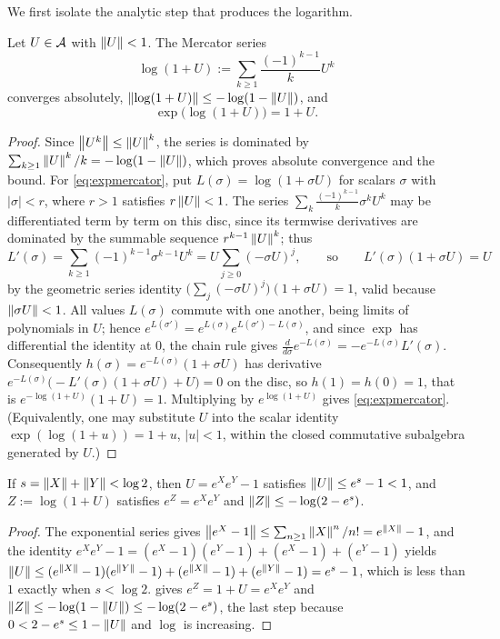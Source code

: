 We first isolate the analytic step that produces the logarithm.
\begin{proposition}\label{prop:mercator}
Let $U\in\mathcal{A}$ with $\left\lVert U\right\rVert<1$. The Mercator series
\begin{equation}\label{eq:mercator}
 \log(1+U):=\sum_{k\geq1}\frac{(-1)^{k-1}}{k}U^k
\end{equation}
converges absolutely, $\left\lVert\log(1+U)\right\rVert\leq-\log(1-\left\lVert U\right\rVert)$, and
\begin{equation}\label{eq:expmercator}
 \exp\bigl(\log(1+U)\bigr)=1+U.
\end{equation}
\end{proposition}
\begin{proof}
Since $\left\lVert U^k\right\rVert\leq\left\lVert U\right\rVert^k$, the series is dominated by
$\sum_{k\geq1}\left\lVert U\right\rVert^k/k=-\log(1-\left\lVert U\right\rVert)$, which proves absolute
convergence and the bound. For \eqref{eq:expmercator}, put
$L(\sigma)=\log(1+\sigma U)$ for scalars $\sigma$ with
$|\sigma|<r$, where $r>1$ satisfies $r\left\lVert U\right\rVert<1$. The series
$\sum_k\frac{(-1)^{k-1}}{k}\sigma^kU^k$ may be differentiated term by term
on this disc, since its termwise derivatives are dominated by the summable
sequence $r^{k-1}\left\lVert U\right\rVert^k$; thus
\[
 L'(\sigma)=\sum_{k\geq1}(-1)^{k-1}\sigma^{k-1}U^k
 =U\sum_{j\geq0}(-\sigma U)^j,
 \qquad\text{so}\qquad L'(\sigma)(1+\sigma U)=U
\]
by the geometric series identity $\bigl(\sum_j(-\sigma U)^j\bigr)(1+\sigma U)=1$,
valid because $\left\lVert\sigma U\right\rVert<1$. All values $L(\sigma)$ commute with one
another, being limits of polynomials in $U$; hence
$e^{L(\sigma')}=e^{L(\sigma)}e^{L(\sigma')-L(\sigma)}$, and since
$\exp$ has differential the identity at $0$, the chain rule gives
$\frac{d}{d\sigma}e^{-L(\sigma)}=-e^{-L(\sigma)}L'(\sigma)$. Consequently
$h(\sigma)=e^{-L(\sigma)}(1+\sigma U)$ has derivative
$e^{-L(\sigma)}\bigl(-L'(\sigma)(1+\sigma U)+U\bigr)=0$ on the disc, so
$h(1)=h(0)=1$, that is $e^{-\log(1+U)}(1+U)=1$. Multiplying by
$e^{\log(1+U)}$ gives \eqref{eq:expmercator}. (Equivalently, one may
substitute $U$ into the scalar identity $\exp(\log(1+u))=1+u$, $|u|<1$,
within the closed commutative subalgebra generated by $U$.)
\end{proof}

\begin{corollary}\label{cor:bchlog}
If $s=\left\lVert X\right\rVert+\left\lVert Y\right\rVert<\log2$, then $U=e^Xe^Y-1$ satisfies
$\left\lVert U\right\rVert\leq e^{s}-1<1$, and $Z:=\log(1+U)$ satisfies $e^Z=e^Xe^Y$ and
$\left\lVert Z\right\rVert\leq-\log(2-e^{s})$.
\end{corollary}
\begin{proof}
The exponential series gives $\left\lVert e^X-1\right\rVert\leq\sum_{n\geq1}\left\lVert X\right\rVert^n/n!
=e^{\left\lVert X\right\rVert}-1$, and the identity
$e^Xe^Y-1=(e^X-1)(e^Y-1)+(e^X-1)+(e^Y-1)$ yields
$\left\lVert U\right\rVert\leq(e^{\left\lVert X\right\rVert}-1)(e^{\left\lVert Y\right\rVert}-1)+(e^{\left\lVert X\right\rVert}-1)+(e^{\left\lVert Y\right\rVert}-1)
=e^{s}-1$, which is less than $1$ exactly when $s<\log2$.
 gives $e^Z=1+U=e^Xe^Y$ and
$\left\lVert Z\right\rVert\leq-\log(1-\left\lVert U\right\rVert)\leq-\log(2-e^{s})$, the last step because
$0<2-e^s\leq1-\left\lVert U\right\rVert$ and $\log$ is increasing.
\end{proof}


